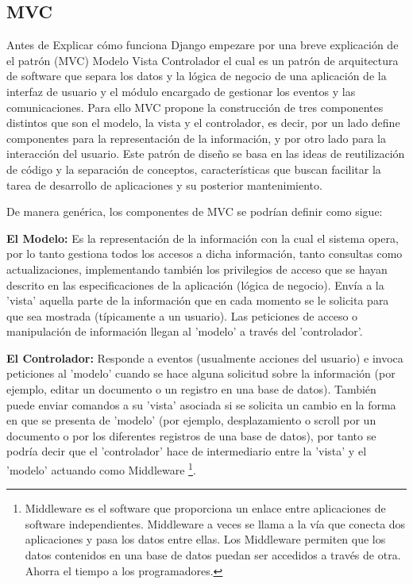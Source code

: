 \subsection{MVC}

Antes de Explicar cómo funciona Django empezare por una breve explicación de el patrón (MVC) Modelo Vista Controlador el cual es un patrón de arquitectura de software que separa los datos y la lógica de negocio de una aplicación de la interfaz de usuario y el módulo encargado de gestionar los eventos y las comunicaciones. Para ello MVC propone la construcción de tres componentes distintos que son el modelo, la vista y el controlador, es decir, por un lado define componentes para la representación de la información, y por otro lado para la interacción  del usuario. Este patrón de diseño se basa en las ideas de reutilización de  código y la separación de conceptos, características que buscan facilitar la  tarea de desarrollo de aplicaciones y su posterior mantenimiento. 

De manera genérica, los componentes de MVC se podrí­an definir como sigue:

{\bfseries  El Modelo:} Es la representación de la información con la cual el sistema opera, por lo tanto gestiona todos los accesos a dicha información, tanto consultas como actualizaciones, implementando también los privilegios de acceso que se hayan descrito en las especificaciones de la aplicación (lógica de negocio). Enví­a a la 'vista' aquella parte de la información que en cada momento se le solicita para que sea mostrada (tí­picamente a un usuario). Las peticiones de acceso o manipulación de información llegan al 'modelo' a través del 'controlador'.

{\bfseries El Controlador:} Responde a eventos (usualmente acciones del usuario) e invoca peticiones al 'modelo' cuando se hace alguna solicitud sobre la información (por ejemplo, editar un documento o un registro en una base de datos). También puede enviar comandos a su 'vista' asociada si se solicita un cambio en la forma en que se presenta de 'modelo' (por ejemplo, desplazamiento  o scroll por un documento o por los diferentes registros de una base de datos),   por tanto se podrí­a decir que el 'controlador' hace de intermediario entre   la 'vista' y el 'modelo' actuando como Middleware \footnote{Middleware es el software que proporciona un enlace entre aplicaciones de software independientes. Middleware a veces se llama a la ví­a que conecta dos aplicaciones y pasa los datos entre ellas. Los Middleware permiten que los datos contenidos en una base de datos puedan ser accedidos a través de otra. Ahorra el tiempo a los programadores.}.
   
